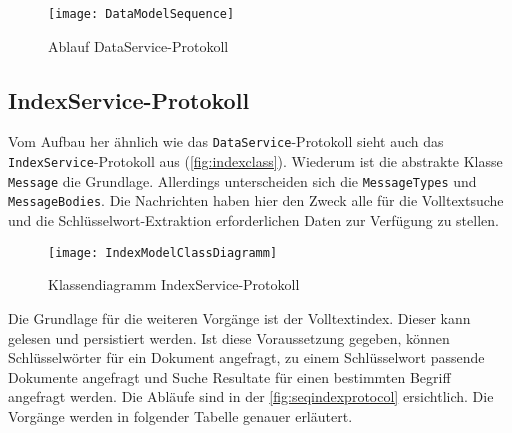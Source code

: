     \begin{figure}[H]
    \centering
    \texttt{[image: DataModelSequence]}
    \caption{Ablauf DataService-Protokoll}
    \label{fig:seqdataprotocol}
    \end{figure}


\subsection{IndexService-Protokoll}

Vom Aufbau her ähnlich wie das \texttt{DataService}-Protokoll sieht auch das \texttt{IndexService}-Protokoll aus (\autoref{fig:indexclass}). Wiederum ist die abstrakte Klasse \texttt{Message} die Grundlage. Allerdings unterscheiden sich die \texttt{Mes\-sa\-ge\-Typ\-es} und \texttt{MessageBodies}. Die Nachrichten haben hier den Zweck alle für die Volltextsuche und die Schlüs\-sel\-wort-\-Ex\-trak\-tion erforderlichen Daten zur Verfügung zu stellen.

    
    \begin{figure}[H]
    \centering
    \texttt{[image: IndexModelClassDiagramm]}
    \caption{Klassendiagramm IndexService-Protokoll}
    \label{fig:indexclass}
    \end{figure}

Die Grundlage für die weiteren Vorgänge ist der Volltextindex. Dieser kann gelesen und persistiert werden. Ist diese Voraussetzung gegeben, können Schlüsselwörter für ein Dokument angefragt, zu einem Schlüsselwort passende Dokumente angefragt und Suche Resultate für einen bestimmten Begriff angefragt werden. Die Abläufe sind in der \autoref{fig:seqindexprotocol} ersichtlich. Die Vorgänge werden in folgender Tabelle genauer erläutert.

